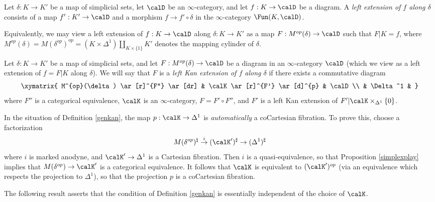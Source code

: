 \begin{definition}
Let $\delta: K \rightarrow K'$ be a map of simplicial sets, let $\calD$ be an $\infty$-category, and let
$f: K \rightarrow \calD$ be a diagram. A {\it left extension of $f$ along $\delta$} consists of a map
$f': K' \rightarrow \calD$ and a morphism $f \rightarrow f' \circ \delta$ in the $\infty$-category
$\Fun(K,\calD)$. 
\end{definition}

Equivalently, we may view a left extension of $f: K \rightarrow \calD$ along $\delta: K \rightarrow K'$
as a map $F: M^{op}(\delta) \rightarrow \calD$ such that $F|K=f$, where $M^{op}(\delta) = M(\delta^{op})^{op} = (K \times \Delta^1) \coprod_{ K \times \{1\} } K'$ denotes the mapping cylinder of $\delta$.

\begin{definition}\label{genkan}
Let $\delta: K \rightarrow K'$ be a map of simplicial sets, and let
$F: M^{op}(\delta) \rightarrow \calD$ be a diagram in an $\infty$-category $\calD$
(which we view as a left extension of $f = F|K$ along $\delta$). We will say that $F$ is a {\it left
Kan extension of $f$ along $\delta$} if there exists a commutative diagram
$$ \xymatrix{ M^{op}(\delta) \ar[r]^{F''} \ar[dr] & \calK \ar[r]^{F'} \ar[d]^{p} & \calD \\
& \Delta^1 & }$$
where $F''$ is a categorical equivalence, $\calK$ is an $\infty$-category, 
$F= F' \circ F''$, and $F'$ is a left Kan extension of $F' | \calK \times_{ \Delta^1} \{0\}$. 
\end{definition}

\begin{remark}\label{genka}
In the situation of Definition \ref{genkan}, the map $p: \calK \rightarrow \Delta^1$ is {\em automatically} a coCartesian fibration. To prove this, choose a factorization
$$ M(\delta^{op})^{\natural} \stackrel{i}{\rightarrow} (\calK')^{\sharp} \rightarrow (\Delta^1)^{\sharp}$$
where $i$ is marked anodyne, and $\calK' \rightarrow \Delta^1$ is a Cartesian fibration. Then $i$ is a quasi-equivalence, so that Proposition \ref{simplexplay} implies that $M(\delta^{op}) \rightarrow \calK'$ is a categorical equivalence. It follows that $\calK$ is equivalent to $(\calK')^{op}$ (via an equivalence which respects the projection to $\Delta^1$), so that the projection
$p$ is a coCartesian fibration.
\end{remark}

The following result asserts that the condition of Definition \ref{genkan} is essentially independent of the choice of $\calK$.

